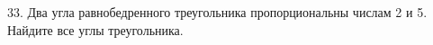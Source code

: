 33. Два угла равнобедренного треугольника пропорциональны числам 2 и 5. Найдите все углы треугольника.\\

